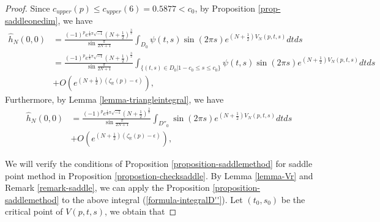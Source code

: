\documentclass[12pt]{amsart}
\begin{document}
\begin{proof}
Since $c_{upper}(p)\leq c_{upper}(6)=0.5877<c_0$, by Proposition \ref{prop-saddleonedim}, we have
\begin{align}
    \hat{h}_N(0,0)&=\frac{(-1)^pe^{\frac{1}{4}\pi\sqrt{-1}}(N+\frac{1}{2})^{\frac{3}{2}}}{\sin \frac{\pi}{2N+1}}\int_{D_0}\psi(t,s)\sin(2\pi s)e^{(N+\frac{1}{2})V_N(p,t,s)}dtds\\\nonumber
    &=\frac{(-1)^pe^{\frac{1}{4}\pi\sqrt{-1}}(N+\frac{1}{2})^{\frac{3}{2}}}{\sin \frac{\pi}{2N+1}}\int_{\{(t,s)\in D_0| 1-c_0\leq s\leq c_0 \}}\psi(t,s)\sin(2\pi s)e^{(N+\frac{1}{2})V_N(p,t,s)}dtds \\\nonumber
    &+O\left(e^{(N+\frac{1}{2})\left(\zeta_{\mathbb{R}}(p)-\epsilon\right)}\right),
\end{align}
Furthermore, by Lemma \ref{lemma-triangleintegral}, we have
\begin{align}\label{formula-integralD''}
    \hat{h}_N(0,0)
    &=\frac{(-1)^pe^{\frac{1}{4}\pi\sqrt{-1}}(N+\frac{1}{2})^{\frac{3}{2}}}{\sin \frac{\pi}{2N+1}}\int_{D''_0}\sin(2\pi s)e^{(N+\frac{1}{2})V_N(p,t,s)}dtds \\\nonumber
    &+O\left(e^{(N+\frac{1}{2})\left(\zeta_{\mathbb{R}}(p)-\epsilon\right)}\right),
\end{align}









We will verify the conditions of Proposition \ref{proposition-saddlemethod} for saddle point method in Proposition \ref{propostion-checksaddle}. By Lemma \ref{lemma-Vr} and  Remark \ref{remark-saddle},   
we can apply the Proposition \ref{proposition-saddlemethod} to the above integral (\ref{formula-integralD''}). Let $(t_0,s_0)$ be the critical point of $V(p,t,s)$, we obtain that 



\end{proof}
\end{document}

